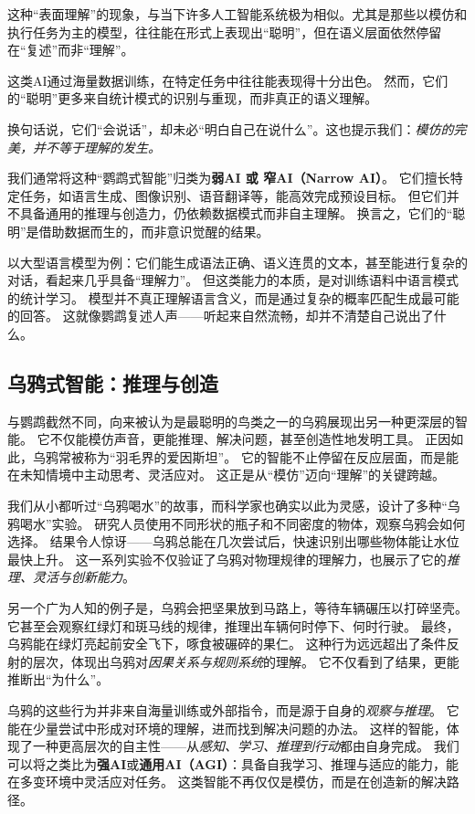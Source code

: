 这种“表面理解”的现象，与当下许多人工智能系统极为相似。尤其是那些以模仿和执行任务为主的模型，往往能在形式上表现出“聪明”，但在语义层面依然停留在“复述”而非“理解”。

这类AI通过海量数据训练，在特定任务中往往能表现得十分出色。
然而，它们的“聪明”更多来自统计模式的识别与重现，而非真正的语义理解。

换句话说，它们“会说话”，却未必“明白自己在说什么”。这也提示我们：\emph{模仿的完美，并不等于理解的发生。}

我们通常将这种“鹦鹉式智能”归类为\textbf{弱AI 或 窄AI（Narrow AI）}。
它们擅长特定任务，如语言生成、图像识别、语音翻译等，能高效完成预设目标。
但它们并不具备通用的推理与创造力，仍依赖数据模式而非自主理解。
换言之，它们的“聪明”是借助数据而生的，而非意识觉醒的结果。

以大型语言模型为例：它们能生成语法正确、语义连贯的文本，甚至能进行复杂的对话，看起来几乎具备“理解力”。
但这类能力的本质，是对训练语料中语言模式的统计学习。
模型并不真正理解语言含义，而是通过复杂的概率匹配生成最可能的回答。
这就像鹦鹉复述人声——听起来自然流畅，却并不清楚自己说出了什么。

\subsection{乌鸦式智能：推理与创造}
与鹦鹉截然不同，向来被认为是最聪明的鸟类之一的乌鸦展现出另一种更深层的智能。
它不仅能模仿声音，更能推理、解决问题，甚至创造性地发明工具。
正因如此，乌鸦常被称为“羽毛界的爱因斯坦”。
它的智能不止停留在反应层面，而是能在未知情境中主动思考、灵活应对。
这正是从“模仿”迈向“理解”的关键跨越。

我们从小都听过“乌鸦喝水”的故事，而科学家也确实以此为灵感，设计了多种“乌鸦喝水”实验。
研究人员使用不同形状的瓶子和不同密度的物体，观察乌鸦会如何选择。
结果令人惊讶——乌鸦总能在几次尝试后，快速识别出哪些物体能让水位最快上升。
这一系列实验不仅验证了乌鸦对物理规律的理解力，也展示了它的\emph{推理、灵活与创新能力}。

另一个广为人知的例子是，乌鸦会把坚果放到马路上，等待车辆碾压以打碎坚壳。
它甚至会观察红绿灯和斑马线的规律，推理出车辆何时停下、何时行驶。
最终，乌鸦能在绿灯亮起前安全飞下，啄食被碾碎的果仁。
这种行为远远超出了条件反射的层次，体现出乌鸦对\emph{因果关系与规则系统}的理解。
它不仅看到了结果，更能推断出“为什么”。

乌鸦的这些行为并非来自海量训练或外部指令，而是源于自身的\emph{观察与推理}。
它能在少量尝试中形成对环境的理解，进而找到解决问题的办法。
这样的智能，体现了一种更高层次的自主性——从\emph{感知、学习、推理到行动}都由自身完成。
我们可以将之类比为\textbf{强AI}或\textbf{通用AI（AGI）}：具备自我学习、推理与适应的能力，能在多变环境中灵活应对任务。
这类智能不再仅仅是模仿，而是在创造新的解决路径。

